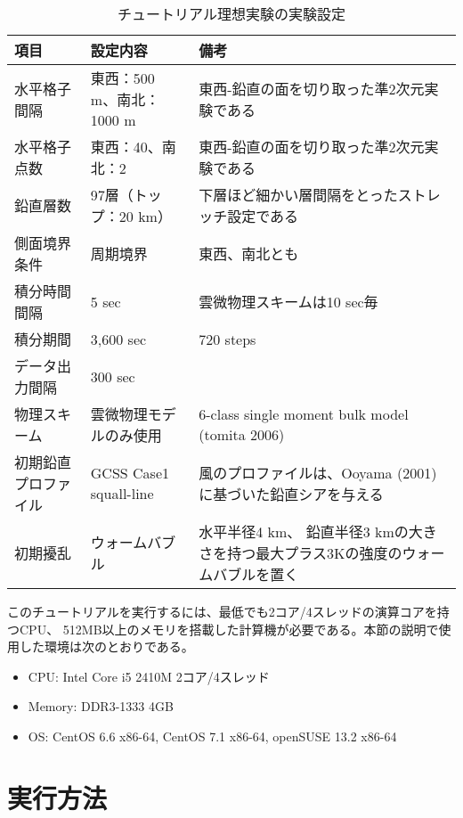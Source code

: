 \begin{table}[htb]
\begin{center}
\caption{チュートリアル理想実験の実験設定}
\begin{tabularx}{150mm}{|l|l|X|} \hline
 \rowcolor[gray]{0.9} 項目 & 設定内容 & 備考 \\ \hline
 水平格子間隔 & 東西：500 m、南北：1000 m & 東西-鉛直の面を切り取った準2次元実験である \\ \hline
 水平格子点数 & 東西：40、南北：2 & 東西-鉛直の面を切り取った準2次元実験である \\ \hline
 鉛直層数     & 97層（トップ：20 km）& 下層ほど細かい層間隔をとったストレッチ設定である \\ \hline
 側面境界条件 & 周期境界 & 東西、南北とも \\ \hline
 積分時間間隔 & 5 sec      & 雲微物理スキームは10 sec毎 \\ \hline
 積分期間     & 3,600 sec  & 720 steps \\ \hline
 データ出力間隔 & 300 sec  &  \\ \hline
 物理スキーム & 雲微物理モデルのみ使用 &
 6-class single moment bulk model (tomita 2006) \\ \hline
 初期鉛直プロファイル & GCSS Case1 squall-line &
 風のプロファイルは、Ooyama (2001)に基づいた鉛直シアを与える \\ \hline
 初期擾乱 & ウォームバブル & 水平半径4 km、
 鉛直半径3 kmの大きさを持つ最大プラス3Kの強度のウォームバブルを置く\\ \hline
\end{tabularx}
\label{tab:setting_ideal}
\end{center}
\end{table}

このチュートリアルを実行するには、最低でも2コア/4スレッドの演算コアを持つCPU、
512MB以上のメモリを搭載した計算機が必要である。本節の説明で使用した環境は次のとおりである。
\begin{itemize}
\item CPU: Intel Core i5 2410M 2コア/4スレッド
\item Memory: DDR3-1333 4GB
\item OS: CentOS 6.6 x86-64, CentOS 7.1 x86-64, openSUSE 13.2 x86-64
\end{itemize}


\section{実行方法}


